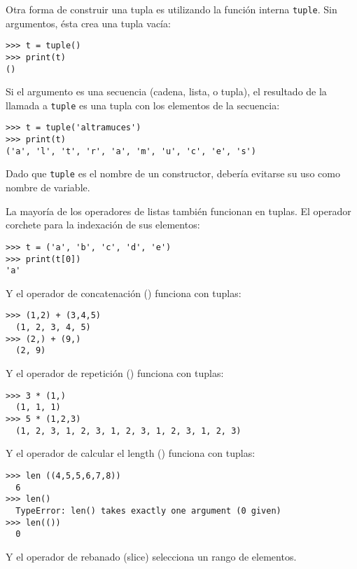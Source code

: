 Otra forma de construir una tupla es utilizando la función interna \texttt{tuple}. Sin argumentos, ésta crea una tupla vacía:

 


\begin{Verbatim}[frame=single]
>>> t = tuple()
>>> print(t)
()
\end{Verbatim}


Si el argumento es una secuencia (cadena, lista, o tupla), el resultado
de la llamada a \texttt{tuple} es una tupla con los elementos de la
secuencia:


\begin{Verbatim}[frame=single]
>>> t = tuple('altramuces')
>>> print(t)
('a', 'l', 't', 'r', 'a', 'm', 'u', 'c', 'e', 's')
\end{Verbatim}


Dado que \texttt{tuple} es el nombre de un constructor, debería evitarse
su uso como nombre de variable.

La mayoría de los operadores de listas también funcionan en tuplas. El
operador corchete para la indexación de sus elementos:

\begin{Verbatim}[frame=single]
>>> t = ('a', 'b', 'c', 'd', 'e')
>>> print(t[0])
'a'
\end{Verbatim}

Y el operador de concatenación (\pythoninline{+}) funciona con tuplas:

\begin{Verbatim}[frame=single]
>>> (1,2) + (3,4,5)
  (1, 2, 3, 4, 5)
>>> (2,) + (9,)
  (2, 9)
\end{Verbatim}

Y el operador de repetición (\pythoninline{*}) funciona con tuplas:

\begin{Verbatim}[frame=single]
>>> 3 * (1,)
  (1, 1, 1)
>>> 5 * (1,2,3)
  (1, 2, 3, 1, 2, 3, 1, 2, 3, 1, 2, 3, 1, 2, 3)
\end{Verbatim}


Y el operador de calcular el length () funciona con tuplas:

\begin{Verbatim}[frame=single]
>>> len ((4,5,5,6,7,8))
  6
>>> len()
  TypeError: len() takes exactly one argument (0 given)
>>> len(()) 
  0
\end{Verbatim}


Y el operador de rebanado (slice) selecciona un rango de elementos.


